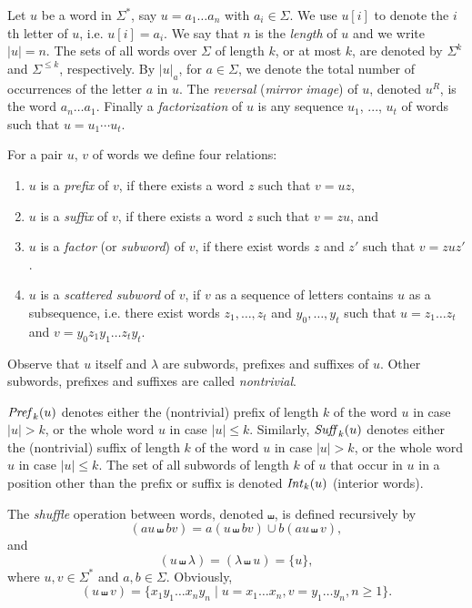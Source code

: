 Let $u$ be a word in $\Sigma^*$, say $u = a_1 \ldots a_n$ with $a_i \in \Sigma$. We use $u[i]$ to denote the $i$th letter of $u$, i.e. $u[i] = a_i$. We say that $n$ is the \emph{length} of $u$ and we write $|u|=n$. The sets of all words over $\Sigma$ of length $k$, or at most $k$, are denoted by $\Sigma^k$ and $\Sigma^{\le k}$, respectively. By $|u|_a$, for $a \in \Sigma$, we denote the total number of occurrences of the letter $a$ in $u$. The \emph{reversal} (\emph{mirror image}) of $u$, denoted $u^R$, is the word $a_n \ldots a_1$. Finally a \emph{factorization} of $u$ is any sequence $u_1$, ..., $u_t$ of words such that $u = u_1 \cdots u_t$.

For a pair $u$, $v$ of words we define four relations:

\begin{enumerate}
\item $u$ is a \emph{prefix} of $v$, if there exists a word $z$ such that $v = uz$,
\item $u$ is a \emph{suffix} of $v$, if there exists a word $z$ such that $v = zu$, and
\item $u$ is a \emph{factor} (or \emph{subword}) of $v$, if there exist words $z$ and $z'$ such that $v = zuz'$.
\item $u$ is a \emph{scattered subword} of $v$, if $v$ as a sequence of letters contains $u$ as a subsequence, i.e. there exist words $z_1, \ldots, z_t$ and $y_0, \ldots, y_t$ such that $u = z_1 \ldots z_t$ and $v = y_0 z_1 y_1 \ldots z_t y_t$.
\end{enumerate}

Observe that $u$ itself and $\lambda$ are subwords, prefixes and suffixes of $u$. Other subwords, prefixes and suffixes are called \emph{nontrivial}.

$\mbox{\it Pref\/}_k(u)$ denotes either the (nontrivial) prefix of length $k$ of the word $u$ in case $|u|>k$, or the whole word $u$ in case $|u|\le k$. Similarly, $\mbox{\it Suff\/}_k(u)$ denotes either the (nontrivial) suffix of length $k$ of the word $u$ in case $|u|>k$, or the whole word $u$ in case $|u|\le k$. The set of all subwords of length $k$ of $u$ that occur in $u$ in a position other than the prefix or suffix is denoted $\mbox{\it Int\/}_k(u)$ (interior words).

The \emph{shuffle} operation between words, denoted $\shuffle$, is defined recursively by $$(au \shuffle bv) = a(u \shuffle bv) \cup b(au \shuffle v),$$ and $$(u \shuffle \lambda) = (\lambda \shuffle u) = \{u\},$$ where $u, v \in \Sigma^*$ and $a, b \in \Sigma$. Obviously, $$(u \shuffle v) = \{x_1 y_1 \ldots x_n y_n \mid u = x_1 \ldots x_n, v = y_1 \ldots y_n, n \ge 1\}.$$


